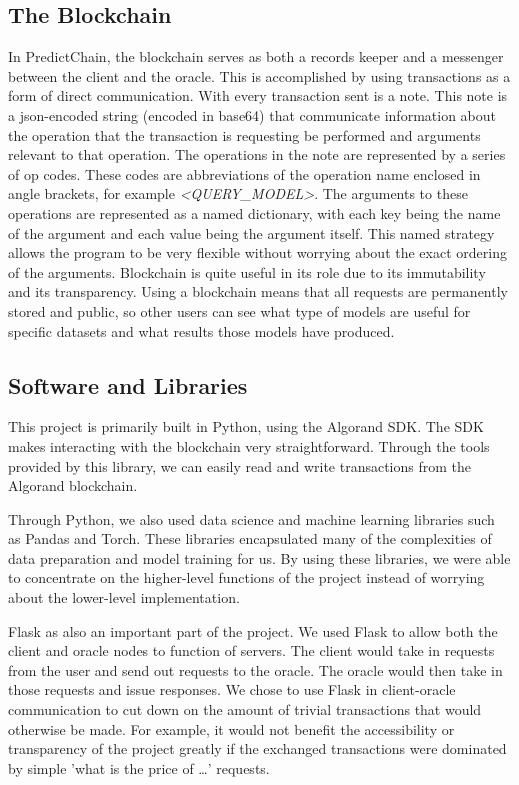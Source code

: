 \documentclass{article}
\begin{document}
    \subsection{The Blockchain}

    In PredictChain, the blockchain serves as both a records keeper and a messenger between the client and the oracle.
    This is accomplished by using transactions as a form of direct communication.  With every transaction sent is a note.
    This note is a json-encoded string (encoded in base64) that communicate information about the operation that the transaction
    is requesting be performed and arguments relevant to that operation.  The operations in the note are represented by a series
    of op codes.  These codes are abbreviations of the operation name enclosed in angle brackets, for example \textit{<QUERY\_MODEL>}.
    The arguments to these operations are represented as a named dictionary, with each key being the name of the argument and each
    value being the argument itself.  This named strategy allows the program to be very flexible without worrying about the exact
    ordering of the arguments.  Blockchain is quite useful in its role due to its immutability and its transparency.  Using
    a blockchain means that all requests are permanently stored and public, so other users can see what type of models are useful
    for specific datasets and what results those models have produced.

    \subsection{Software and Libraries}

    This project is primarily built in Python, using the Algorand SDK.  The SDK makes interacting with the blockchain
    very straightforward.  Through the tools provided by this library, we can easily read and write transactions from
    the Algorand blockchain.

    Through Python, we also used data science and machine learning libraries such as Pandas
    and Torch.  These libraries encapsulated many of the complexities of data preparation and model training for us.
    By using these libraries, we were able to concentrate on the higher-level functions of the project instead of worrying
    about the lower-level implementation.

    Flask as also an important part of the project.  We used Flask to allow both
    the client and oracle nodes to function of servers.  The client would take in requests from the user and send out
    requests to the oracle.  The oracle would then take in those requests and issue responses.  We chose to use Flask in
    client-oracle communication to cut down on the amount of trivial transactions that would otherwise be made.  For example,
    it would not benefit the accessibility or transparency of the project greatly if the exchanged transactions were
    dominated by simple 'what is the price of \ldots' requests.
\end{document}

